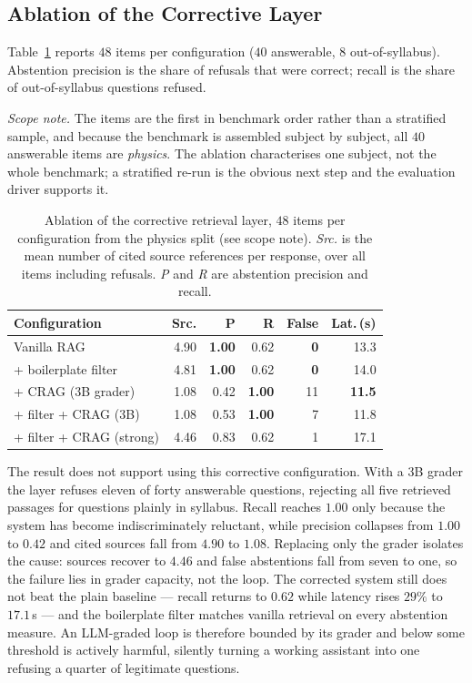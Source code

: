 \documentclass[conference]{IEEEtran}
\begin{document}
\subsection{Ablation of the Corrective Layer}
\label{sec:ablation}
Table~\ref{tab:ablation} reports $48$ items per configuration ($40$ answerable,
$8$ out-of-syllabus). Abstention precision is the share of refusals that were
correct; recall is the share of out-of-syllabus questions refused.

\textit{Scope note.} The items are the first in benchmark order rather than a
stratified sample, and because the benchmark is assembled subject by subject,
all $40$ answerable items are \emph{physics}. The ablation characterises one
subject, not the whole benchmark; a stratified re-run is the obvious next step
and the evaluation driver supports it.

\begin{table}[htbp]
\caption{Ablation of the corrective retrieval layer, $48$ items per
configuration from the physics split (see scope note). \emph{Src.} is the mean
number of cited source references per response, over all items including
refusals. \emph{P} and \emph{R} are abstention precision and recall.}
\label{tab:ablation}
\centering
\footnotesize
\setlength{\tabcolsep}{4pt}
\begin{tabular}{@{}lrrrrr@{}}
\toprule
\textbf{Configuration} & \textbf{Src.} & \textbf{P} & \textbf{R} & \textbf{False} & \textbf{Lat.\,(s)} \\
\midrule
Vanilla RAG              & 4.90 & \textbf{1.00} & 0.62 & \textbf{0}  & 13.3 \\
+ boilerplate filter     & 4.81 & \textbf{1.00} & 0.62 & \textbf{0}  & 14.0 \\
+ CRAG ($3$B grader)     & 1.08 & 0.42 & \textbf{1.00} & 11 & \textbf{11.5} \\
+ filter + CRAG ($3$B)   & 1.08 & 0.53 & \textbf{1.00} & 7  & 11.8 \\
+ filter + CRAG (strong) & 4.46 & 0.83 & 0.62 & 1  & 17.1 \\
\bottomrule
\end{tabular}
\end{table}

The result does not support using this corrective configuration. With a $3$B
grader the layer refuses eleven of forty answerable questions, rejecting all
five retrieved passages for questions plainly in syllabus. Recall reaches $1.00$
only because the system has become indiscriminately reluctant, while precision
collapses from $1.00$ to $0.42$ and cited sources fall from $4.90$ to $1.08$.
Replacing only the grader isolates the cause: sources recover to $4.46$ and
false abstentions fall from seven to one, so the failure lies in grader
capacity, not the loop. The corrected system still does not beat the plain
baseline --- recall returns to $0.62$ while latency rises $29\%$ to $17.1$\,s
--- and the boilerplate filter matches vanilla retrieval on every abstention
measure. An LLM-graded loop is therefore bounded by its grader and below some
threshold is actively harmful, silently turning a working assistant into one
refusing a quarter of legitimate questions.
\end{document}
